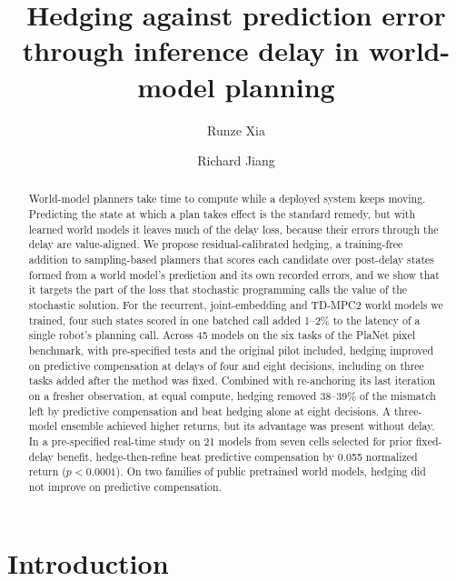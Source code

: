 \documentclass[aps,physrev,\manuscriptlayout,superscriptaddress,
  longbibliography,amsmath,amssymb]{revtex4-2}
\begin{document}
\title{Hedging against prediction error through inference delay in world-model planning}
\author{Runze Xia}
\author{Richard Jiang}

\begin{abstract}
World-model planners take time to compute while a deployed system keeps moving. Predicting the state at which a plan takes effect is the standard remedy, but with learned world models it leaves much of the delay loss, because their errors through the delay are value-aligned. We propose residual-calibrated hedging, a training-free addition to sampling-based planners that scores each candidate over post-delay states formed from a world model's prediction and its own recorded errors, and we show that it targets the part of the loss that stochastic programming calls the value of the stochastic solution. For the recurrent, joint-embedding and TD-MPC2 world models we trained, four such states scored in one batched call added 1--2\% to the latency of a single robot's planning call. Across 45 models on the six tasks of the PlaNet pixel benchmark, with pre-specified tests and the original pilot included, hedging improved on predictive compensation at delays of four and eight decisions, including on three tasks added after the method was fixed. Combined with re-anchoring its last iteration on a fresher observation, at equal compute, hedging removed 38--39\% of the mismatch left by predictive compensation and beat hedging alone at eight decisions. A three-model ensemble achieved higher returns, but its advantage was present without delay. In a pre-specified real-time study on 21 models from seven cells selected for prior fixed-delay benefit, hedge-then-refine beat predictive compensation by 0.055 normalized return ($p<0.0001$). On two families of public pretrained world models, hedging did not improve on predictive compensation.
\end{abstract}
\maketitle

\section{Introduction}\label{sec:intro}
\end{document}
